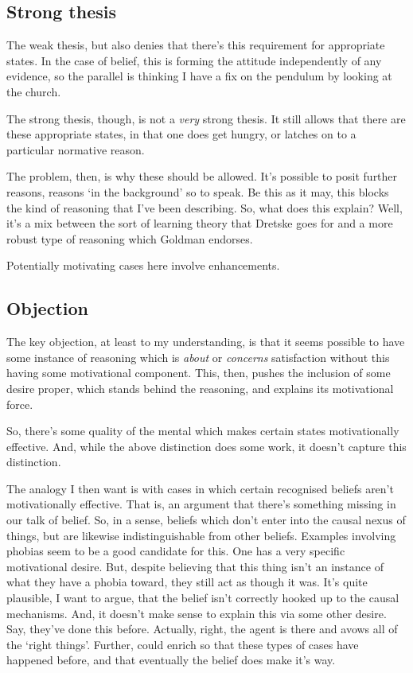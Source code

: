 \documentclass[10pt]{article}
\begin{document}
\subsection{Strong thesis}
\label{sec:strong-thesis}


The weak thesis, but also denies that there's this requirement for appropriate states.
In the case of belief, this is forming the attitude independently of any evidence, so the parallel is thinking I have a fix on the pendulum by looking at the church.

The strong thesis, though, is not a \emph{very} strong thesis.
It still allows that there are these appropriate states, in that one does get hungry, or latches on to a particular normative reason.

The problem, then, is why these should be allowed.
It's possible to posit further reasons, reasons `in the background' so to speak.
Be this as it may, this blocks the kind of reasoning that I've been describing.
So, what does this explain?
Well, it's a mix between the sort of learning theory that Dretske goes for and a more robust type of reasoning which Goldman endorses.

Potentially motivating cases here involve enhancements.


\subsection{Objection}
\label{sec:objection}

The key objection, at least to my understanding, is that it seems possible to have some instance of reasoning which is \emph{about} or \emph{concerns} satisfaction without this having some motivational component.
This, then, pushes the inclusion of some desire proper, which stands behind the reasoning, and explains its motivational force.

So, there's some quality of the mental which makes certain states motivationally effective.
And, while the above distinction does some work, it doesn't capture this distinction.

The analogy I then want is with cases in which certain recognised beliefs aren't motivationally effective.
That is, an argument that there's something missing in our talk of belief.
So, in a sense, beliefs which don't enter into the causal nexus of things, but are likewise indistinguishable from other beliefs.
Examples involving phobias seem to be a good candidate for this.
One has a very specific motivational desire.
But, despite believing that this thing isn't an instance of what they have a phobia toward, they still act as though it was.
It's quite plausible, I want to argue, that the belief isn't correctly hooked up to the causal mechanisms.
And, it doesn't make sense to explain this via some other desire.
Say, they've done this before.
Actually, right, the agent is there and avows all of the `right things'.
Further, could enrich so that these types of cases have happened before, and that eventually the belief does make it's way.
\end{document}
